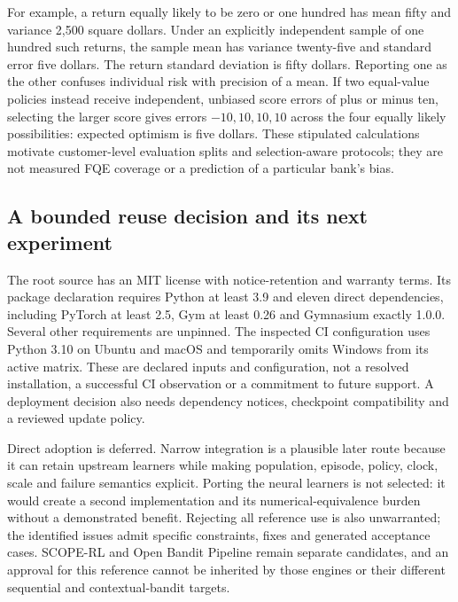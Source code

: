 For example, a return equally likely to be zero or one hundred has mean fifty
and variance 2,500 square dollars. Under an explicitly independent sample of
one hundred such returns, the sample mean has variance twenty-five and
standard error five dollars. The return standard deviation is fifty dollars.
Reporting one as the other confuses individual risk with precision of a mean.
If two equal-value policies instead receive independent, unbiased score
errors of plus or minus ten, selecting the larger score gives errors
\(-10,10,10,10\) across the four equally likely possibilities: expected
optimism is five dollars. These stipulated calculations motivate customer-level
evaluation splits and selection-aware protocols; they are not measured FQE
coverage or a prediction of a particular bank's bias.
\citep{exec15_d3rlpy_exact}

\subsection{A bounded reuse decision and its next experiment}

The root source has an MIT license with notice-retention and warranty terms.
Its package declaration requires Python at least 3.9 and eleven direct
dependencies, including PyTorch at least 2.5, Gym at least 0.26 and Gymnasium
exactly 1.0.0. Several other requirements are unpinned. The inspected CI
configuration uses Python 3.10 on Ubuntu and macOS and temporarily omits
Windows from its active matrix. These are declared inputs and configuration,
not a resolved installation, a successful CI observation or a commitment to
future support. A deployment decision also needs dependency notices,
checkpoint compatibility and a reviewed update policy.
\citep{exec15_d3rlpy_package}

Direct adoption is deferred. Narrow integration is a plausible later route
because it can retain upstream learners while making population, episode,
policy, clock, scale and failure semantics explicit. Porting the neural
learners is not selected: it would create a second implementation and its
numerical-equivalence burden without a demonstrated benefit. Rejecting all
reference use is also unwarranted; the identified issues admit specific
constraints, fixes and generated acceptance cases. SCOPE-RL and Open Bandit
Pipeline remain separate candidates, and an approval for this reference
cannot be inherited by those engines or their different sequential and
contextual-bandit targets. \citep{exec15_d3rlpy_contract}

